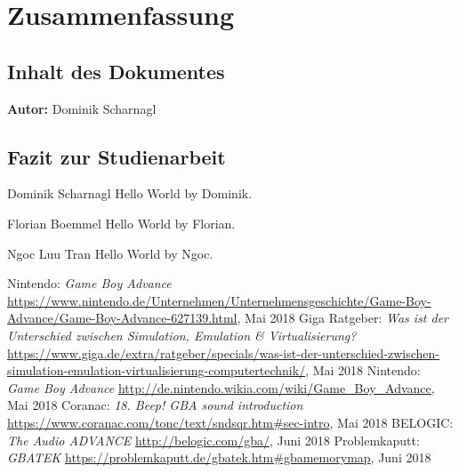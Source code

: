 \documentclass[11pt,a4paper]{scrartcl}
\newcommand{\AutorDominik} {
    \vspace{-4mm}
    \large \textbf{Autor:} Dominik Scharnagl \normalsize
    \vspace{2mm}
}
\begin{document}
\newpage


\section{Zusammenfassung} \label{Zusammenfassung}


\subsection{Inhalt des Dokumentes}
\AutorDominik

\subsection{Fazit zur Studienarbeit}

\large Dominik Scharnagl
\vspace{2mm}\newline
Hello World by Dominik.

\vspace{5mm}
\large Florian Boemmel
\vspace{2mm}\newline
Hello World by Florian.

\vspace{5mm}
\large Ngoc Luu Tran
\vspace{2mm}\newline
Hello World by Ngoc.


\newpage
{}

\begin{thebibliography}{tiefe}
    Nintendo: \textit{Game Boy Advance}\newline
    \url{https://www.nintendo.de/Unternehmen/Unternehmensgeschichte/Game-Boy-Advance/Game-Boy-Advance-627139.html}, Mai 2018
    Giga Ratgeber: \textit{Was ist der Unterschied zwischen Simulation, Emulation \& Virtualisierung?}\newline
    \url{https://www.giga.de/extra/ratgeber/specials/was-ist-der-unterschied-zwischen-simulation-emulation-virtualisierung-computertechnik/}, Mai 2018
    Nintendo: \textit{Game Boy Advance}\newline
    \url{http://de.nintendo.wikia.com/wiki/Game_Boy_Advance}, Mai 2018
    Coranac: \textit{18. Beep! GBA sound introduction}\newline
    \url{https://www.coranac.com/tonc/text/sndsqr.htm#sec-intro}, Mai 2018
    BELOGIC: \textit{The Audio ADVANCE}\newline
    \url{http://belogic.com/gba/}, Juni 2018
		Problemkaputt: \textit{GBATEK}\newline
    \url{https://problemkaputt.de/gbatek.htm#gbamemorymap}, Juni 2018
\end{thebibliography}
\end{document}
